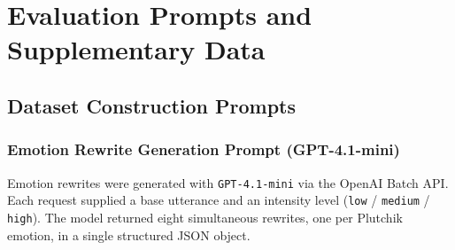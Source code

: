 \appendix
\chapter{Evaluation Prompts and Supplementary Data}

\section{Dataset Construction Prompts}
\label{app:dataset_prompts}

\subsection{Emotion Rewrite Generation Prompt (GPT-4.1-mini)}
\label{app:rewrite_prompt}

Emotion rewrites were generated with \texttt{GPT-4.1-mini} via the OpenAI Batch API.
Each request supplied a base utterance and an intensity level (\texttt{low} /
\texttt{medium} / \texttt{high}).
The model returned eight simultaneous rewrites, one per Plutchik emotion, in a single structured JSON object.

